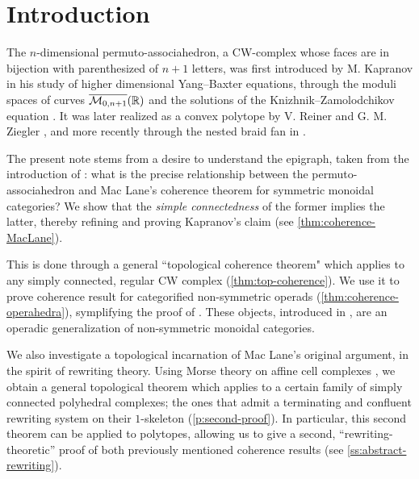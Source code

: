 
\section*{Introduction} 
\label{s:introduction}

The $n$-dimensional permuto-associahedron, a CW-complex whose faces are in bijection with parenthesized  of $n+1$ letters, was first introduced by M. Kapranov in his study of higher dimensional Yang--Baxter equations, through the moduli spaces of curves $\overline{\mathcal{M}_{0,n+1}}(\mathbb R)$ and the solutions of the Knizhnik--Zamolodchikov equation \cite{kapranov1993}.
It was later realized as a convex polytope by V. Reiner and G. M. Ziegler \cite{reinerCoxeterassociahedra1994}, and more recently through the nested braid fan in \cite{CastilloLiu21}.

The present note stems from a desire to understand the epigraph, taken from the introduction of \cite{kapranov1993}: what is the precise relationship between the permuto-associahedron and Mac Lane's coherence theorem for symmetric monoidal categories? 
We show that the \emph{simple connectedness} of the former implies the latter, thereby refining and proving Kapranov's claim (see \cref{thm:coherence-MacLane}).

This is done through a general ``topological coherence theorem" which applies to any simply connected, regular CW complex (\cref{thm:top-coherence}).
We use it to prove coherence result for categorified non-symmetric operads (\cref{thm:coherence-operahedra}), symplifying the proof of \cite{DP15}. 
These objects, introduced in \cite{DP15}, are an operadic generalization of non-symmetric monoidal categories. 

We also investigate a topological incarnation of Mac Lane's original argument, in the spirit of rewriting theory. 
Using Morse theory on affine cell complexes \cite{bestvinaMorseTheoryFiniteness1997}, we obtain a general topological theorem which applies to a certain family of simply connected polyhedral complexes; the ones that admit a terminating and confluent rewriting system on their $1$-skeleton (\cref{p:second-proof}). 
In particular, this second theorem can be applied to polytopes, allowing us to give a second, ``rewriting-theoretic'' proof of both previously mentioned coherence results (see \cref{ss:abstract-rewriting}). 

